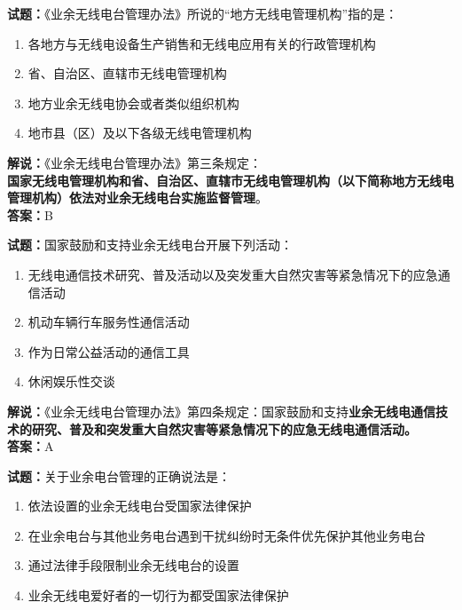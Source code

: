 \documentclass{ctexbook}
\begin{document}
\bigskip

\noindent\textbf{试题：}《业余无线电台管理办法》所说的“地方无线电管理机构”指的是：

\begin{enumerate}[leftmargin=3em]
  \item 各地方与无线电设备生产销售和无线电应用有关的行政管理机构
  \item 省、自治区、直辖市无线电管理机构
  \item 地方业余无线电协会或者类似组织机构
  \item 地市县（区）及以下各级无线电管理机构
\end{enumerate}

\noindent\textbf{解说：}《业余无线电台管理办法》第三条规定：\\\textbf{国家无线电管理机构和省、自治区、直辖市无线电管理机构（以下简称地方无线电管理机构）依法对业余无线电台实施监督管理}。\\\noindent\textbf{答案：}B

\bigskip

\noindent\textbf{试题：}国家鼓励和支持业余无线电台开展下列活动：

\begin{enumerate}[leftmargin=3em]
  \item 无线电通信技术研究、普及活动以及突发重大自然灾害等紧急情况下的应急通信活动
  \item 机动车辆行车服务性通信活动
  \item 作为日常公益活动的通信工具
  \item 休闲娱乐性交谈
\end{enumerate}

\noindent\textbf{解说：}《业余无线电台管理办法》第四条规定：国家鼓励和支持\textbf{业余无线电通信技术的研究、普及和突发重大自然灾害等紧急情况下的应急无线电通信活动。}\\\noindent\textbf{答案：}A

\bigskip

\noindent\textbf{试题：}关于业余电台管理的正确说法是：

\begin{enumerate}[leftmargin=3em]
  \item 依法设置的业余无线电台受国家法律保护
  \item 在业余电台与其他业务电台遇到干扰纠纷时无条件优先保护其他业务电台
  \item 通过法律手段限制业余无线电台的设置
  \item 业余无线电爱好者的一切行为都受国家法律保护
\end{enumerate}
\end{document}
